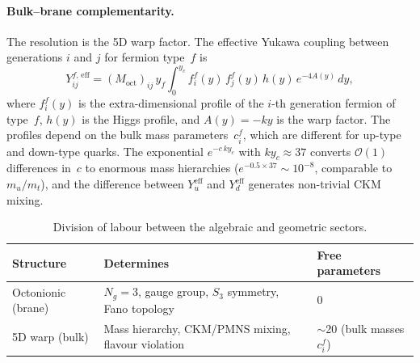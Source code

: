 \paragraph{Bulk--brane complementarity.}
The resolution is the 5D warp factor. The effective Yukawa coupling between generations $i$ and $j$ for fermion type~$f$ is
\begin{equation}
  Y_{ij}^{f,\,\mathrm{eff}} = (M_{\mathrm{oct}})_{ij}\, y_f \int_0^{y_c} f_i^f(y)\, f_j^f(y)\, h(y)\, e^{-4A(y)}\, dy,
  \label{eq:4-90}
\end{equation}
where $f_i^f(y)$ is the extra-dimensional profile of the $i$-th generation fermion of type~$f$, $h(y)$ is the Higgs profile, and $A(y) = -ky$ is the warp factor. The profiles depend on the bulk mass parameters~$c_i^f$, which are different for up-type and down-type quarks. The exponential $e^{-c\, k y_c}$ with $ky_c \approx 37$ converts $\mathcal{O}(1)$ differences in~$c$ to enormous mass hierarchies ($e^{-0.5 \times 37} \sim 10^{-8}$, comparable to $m_u/m_t$), and the difference between $Y_u^{\mathrm{eff}}$ and $Y_d^{\mathrm{eff}}$ generates non-trivial CKM mixing.

\begin{table}[htbp]
\centering
\caption{Division of labour between the algebraic and geometric sectors.}
\label{tab:4-5}
\small
\begin{tabular}{@{}lll@{}}
\toprule
Structure & Determines & Free parameters \\
\midrule
Octonionic (brane) & $N_g = 3$, gauge group, $S_3$ symmetry, Fano topology & 0 \\
5D warp (bulk) & Mass hierarchy, CKM/PMNS mixing, flavour violation & $\sim$20 (bulk masses $c_i^f$) \\
\bottomrule
\end{tabular}
\end{table}

